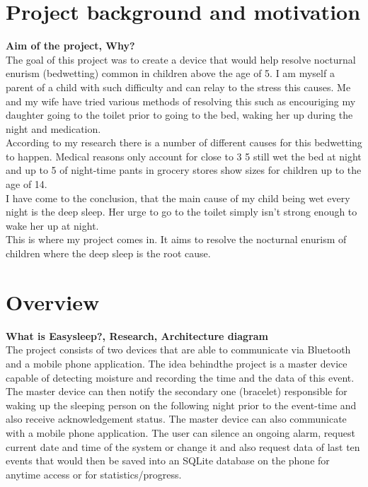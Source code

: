 \documentclass[12pt,a4paper]{article}
\begin{document}
	\section{Project background and motivation}
	{\bfseries Aim of the project, Why?}\\
	
	The goal of this project was to create a device that would help resolve nocturnal enurism (bedwetting) common in children above the age of 5. I am myself a parent of a child with  
	such difficulty and can relay to the stress this causes. Me and my wife have tried various  
	methods of resolving this such as encouriging my daughter going to the toilet prior to  
	going to the bed, waking her up during the night and medication.\\
	
	According to my research there is a number of different causes for this bedwetting to 
	happen. Medical reasons only account for close to 3%
	5 still wet the bed at night and up to 5%
	of night-time pants in grocery stores show sizes for children up to the age of 14.\\
	
	I have come to the conclusion, that the main cause of my child being wet every night is the 
	deep sleep. Her urge to go to the toilet simply isn't strong enough to wake her up at night.\\
	
	This is where my project comes in. It aims to resolve the nocturnal enurism of children 
	where the deep sleep is the root cause.
	\newpage
	
	\section{Overview}
	{\bfseries What is Easysleep?, Research, Architecture diagram}\\
	
	The project consists of two devices that are able to communicate via Bluetooth and a mobile phone application. The idea behindthe project is a master device capable of detecting moisture and recording the time and the data of this event. The master device can then notify the secondary one (bracelet) responsible for waking up the sleeping person on the following night prior to the event-time and also receive acknowledgement status. The master device can also communicate with a mobile phone application.  The user can silence an ongoing alarm, request current date and time of the system or change it and also request data of last ten events that would then be saved into an SQLite database on the phone for anytime access or for statistics/progress.
	\newpage
	
\end{document}
